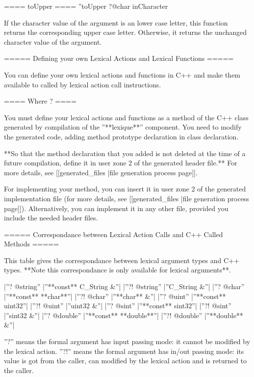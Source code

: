 ==== toUpper ====
''toUpper ?@char inCharacter %


If the character value of the argument is an lower case letter, this function returns the corresponding upper case letter. Otherwise, it returns the unchanged character value of the argument.



===== Defining your own Lexical Actions and Lexical Functions =====

You can define your own lexical actions and functions in C++ and make them available to called by lexical action call instructions.

==== Where ? ====

You must define your lexical actions and functions as a method of the C++ class generated by compilation of the ''**lexique**'' component. You need to modify the generated code, adding method prototype declaration in class declaration.

**So that the method declaration that you added is not deleted at the time of a future compilation, define it in user zone 2 of the generated header file.** For more details, see [[generated\_files |file generation process page]].

For implementing your method, you can insert it in user zone 2 of the generated implementation file (for more details, see [[generated\_files |file generation process page]]). Alternatively, you can implement it in any other file, provided you include the needed header files.

===== Correspondance between Lexical Action Calls and C++ Called Methods =====

This table gives the correspondance between lexical argument types and C++ types. **Note this correspondance is only available for lexical arguments**.

|''? @string''  |''**const** C\_String \&''|
|''?! @string''  |''C\_String \&''|
|''? @char''  |''**const** **char**''|
|''?! @char''  |''**char** \&''|
|''? @uint''  |''**const** uint32''|
|''?! @uint''  |''uint32 \&''|
|''? @sint''  |''**const** sint32''|
|''?! @sint''  |''sint32 \&''|
|''? @double''  |''**const** **double**''|
|''?! @double''  |''**double** \&''|

''?'' means the formal argument has input passing mode: it cannot be modified by the lexical action. ''?!'' means the formal argument has in/out passing mode: its value is got from the caller, can modified by the lexical action and is returned to the caller.

